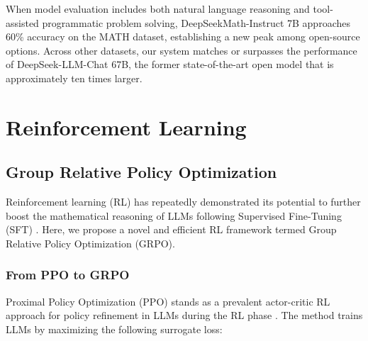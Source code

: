 When model evaluation includes both natural language reasoning and tool-assisted programmatic problem solving, DeepSeekMath-Instruct 7B approaches 60\% accuracy on the MATH dataset, establishing a new peak among open-source options. Across other datasets, our system matches or surpasses the performance of DeepSeek-LLM-Chat 67B, the former state-of-the-art open model that is approximately ten times larger.

\section{Reinforcement Learning}

\subsection{Group Relative Policy Optimization} 
Reinforcement learning (RL) has repeatedly demonstrated its potential to further boost the mathematical reasoning of LLMs following Supervised Fine-Tuning (SFT) \citep{wang2023math,wizardmath}. Here, we propose a novel and efficient RL framework termed Group Relative Policy Optimization (GRPO).

\subsubsection{From PPO to GRPO} 
Proximal Policy Optimization (PPO) \citep{schulman2017proximal} stands as a prevalent actor-critic RL approach for policy refinement in LLMs during the RL phase \citep{ouyang2022training}. The method trains LLMs by maximizing the following surrogate loss:

